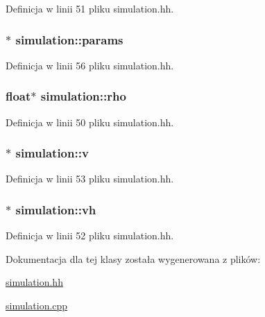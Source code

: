 Definicja w linii 51 pliku simulation.\+hh.

\hypertarget{classsimulation_a861b82cc3c0e7e58abfba464a133dae3}{}
\subsubsection[{params}]{$\ast$ simulation\+::params\hspace{0.3cm}{\ttfamily [private]}}\label{classsimulation_a861b82cc3c0e7e58abfba464a133dae3}


Definicja w linii 56 pliku simulation.\+hh.

\hypertarget{classsimulation_a44081d4edd92e17a3e1067b976031a00}{}
\subsubsection[{rho}]{\setlength{\rightskip}{0pt plus 5cm}float$\ast$ simulation\+::rho\hspace{0.3cm}{\ttfamily [private]}}\label{classsimulation_a44081d4edd92e17a3e1067b976031a00}


Definicja w linii 50 pliku simulation.\+hh.

\hypertarget{classsimulation_a39dbad79b1b8667840638a35e839a3f7}{}
\subsubsection[{v}]{$\ast$ simulation\+::v\hspace{0.3cm}{\ttfamily [private]}}\label{classsimulation_a39dbad79b1b8667840638a35e839a3f7}


Definicja w linii 53 pliku simulation.\+hh.

\hypertarget{classsimulation_ae6da1f15728f49be7b0793700866ede9}{}
\subsubsection[{vh}]{$\ast$ simulation\+::vh\hspace{0.3cm}{\ttfamily [private]}}\label{classsimulation_ae6da1f15728f49be7b0793700866ede9}


Definicja w linii 52 pliku simulation.\+hh.



Dokumentacja dla tej klasy została wygenerowana z plików\+:\begin{DoxyCompactItemize}
\item 
\hyperlink{simulation_8hh}{simulation.\+hh}\item 
\hyperlink{simulation_8cpp}{simulation.\+cpp}\end{DoxyCompactItemize}
